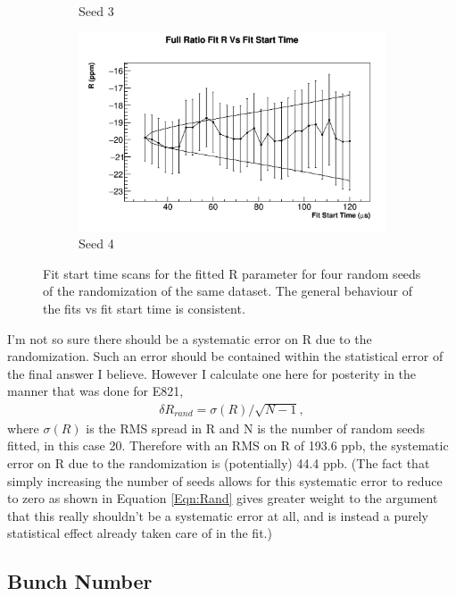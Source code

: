 \begin{figure}[]
\begin{subfigure}[t]{0.45\textwidth}
			    \caption{Seed 3}
		    \end{subfigure}
		    \begin{subfigure}[t]{0.45\textwidth}
			    \centering
				\includegraphics[width=\textwidth]{RatioCBO_R_FS_canv-Seed18}
			    \caption{Seed 4}
		    \end{subfigure}%
		\caption[RandomSeedFitStartScansR]{Fit start time scans for the fitted R parameter for four random seeds of the randomization of the same dataset. The general behaviour of the fits vs fit start time is consistent.}
		\label{fig:RandomSeedFitStartScansR}
		\end{figure}

		I'm not so sure there should be a systematic error on R due to the randomization. Such an error should be contained within the statistical error of the final answer I believe. However I calculate one here for posterity in the manner that was done for E821,
			\begin{align}
				\delta R_{rand} = \sigma(R)/\sqrt{N-1},
			\label{Eqn:Rand}
			\end{align}
		where $\sigma(R)$ is the RMS spread in R and N is the number of random seeds fitted, in this case 20. Therefore with an RMS on R of 193.6 ppb, the systematic error on R due to the randomization is (potentially) 44.4 ppb. (The fact that simply increasing the number of seeds allows for this systematic error to reduce to zero as shown in Equation \ref{Eqn:Rand} gives greater weight to the argument that this really shouldn't be a systematic error at all, and is instead a purely statistical effect already taken care of in the fit.)


	\subsection{Bunch Number}

